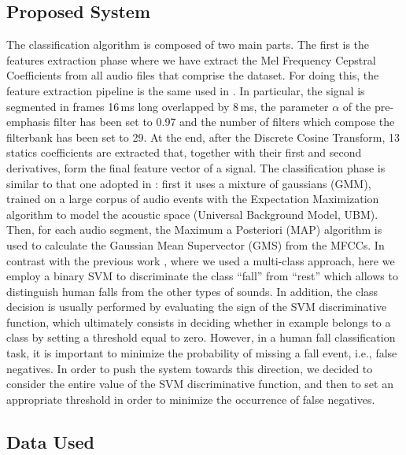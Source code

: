 \subsection{Proposed System}
The classification algorithm is composed of two main parts.
The first is the features extraction phase where we have extract the Mel Frequency Cepstral Coefficients from all audio files that comprise the dataset. For doing this, the feature extraction pipeline is the same used in . In particular, the signal is segmented in frames 16\,ms long overlapped by 8\,ms, the parameter $\alpha$ of the pre-emphasis filter has been set to 0.97 and the number of filters which compose the filterbank has been set to 29. At the end, after the Discrete Cosine Transform, 13 statics coefficients are extracted that, together with their first and second derivatives, form the final feature vector of a signal.
The classification phase is similar to that one adopted in : first it uses a mixture of gaussians (GMM), trained on a large corpus of audio events with the Expectation Maximization algorithm to model the acoustic space (Universal Background Model, UBM). Then, for each audio segment, the Maximum a Posteriori (MAP) algorithm is used to calculate the Gaussian Mean Supervector (GMS) from the MFCCs. %
In contrast with the previous work , where we used a multi-class approach, here we employ a binary SVM to discriminate the class ``fall'' from ``rest'' which allows to distinguish human falls from the other types of sounds. In addition, the class decision is usually performed by evaluating the sign of the SVM discriminative function, which ultimately consists in deciding whether in example belongs to a class by setting a threshold equal to zero. However, in a human fall classification task, it is important to minimize the probability of missing a fall event, i.e., false negatives. In order to push the system towards this direction, we decided to consider the entire value of the SVM discriminative function, and then to set an appropriate threshold in order to minimize the occurrence of false negatives.

\subsection{Data Used}\label{sec:data_binary_svm}

